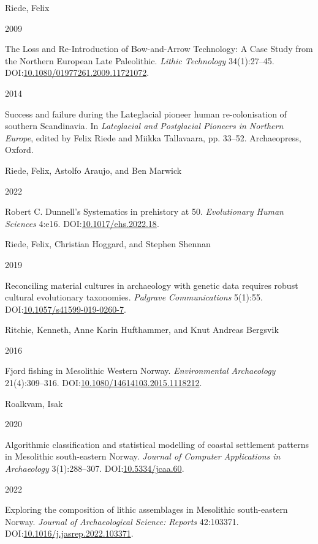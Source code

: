 \documentclass[
  12pt,
  a4paper,
  oneside]{book}
\newlength{\cslhangindent}
\newlength{\csllabelwidth}
\newlength{\cslentryspacingunit} %
\newenvironment{CSLReferences}[2] %
 {%
  \setlength{\parindent}{0pt}
  \ifodd #1
  \let\oldpar\par
  \def\par{\hangindent=\cslhangindent\oldpar}
  \fi
  \setlength{\parskip}{#2\cslentryspacingunit}
 }%
 {}
\newcommand{\CSLBlock}[1]{#1\hfill\break}
\newcommand{\CSLLeftMargin}[1]{\parbox[t]{\csllabelwidth}{#1}}
\newcommand{\CSLRightInline}[1]{\parbox[t]{\linewidth - \csllabelwidth}{#1}\break}
\begin{document}
\begin{CSLReferences}{0}{0}
\leavevmode{}%
\CSLBlock{Riede, Felix}
\CSLLeftMargin{ 2009}
\CSLRightInline{The Loss and Re-Introduction of Bow-and-Arrow Technology: A Case Study from the Northern European Late Paleolithic. \emph{Lithic Technology} 34(1):27--45. DOI:\href{https://doi.org/10.1080/01977261.2009.11721072}{10.1080/01977261.2009.11721072}.}

\leavevmode{}%
\CSLLeftMargin{ 2014 }
\CSLRightInline{{Success and failure during the Lateglacial pioneer human re-colonisation of southern Scandinavia}. In \emph{{Lateglacial and Postglacial Pioneers in Northern Europe}}, edited by Felix Riede and Miikka Tallavaara, pp. 33--52. Archaeopress, Oxford.}

\leavevmode{}%
\CSLBlock{Riede, Felix, Astolfo Araujo, and Ben Marwick}
\CSLLeftMargin{ 2022}
\CSLRightInline{{Robert C. Dunnell's Systematics in prehistory at 50}. \emph{Evolutionary Human Sciences} 4:e16. DOI:\href{https://doi.org/10.1017/ehs.2022.18}{10.1017/ehs.2022.18}.}

\leavevmode{}%
\CSLBlock{Riede, Felix, Christian Hoggard, and Stephen Shennan}
\CSLLeftMargin{ 2019}
\CSLRightInline{Reconciling material cultures in archaeology with genetic data requires robust cultural evolutionary taxonomies. \emph{Palgrave Communications} 5(1):55. DOI:\href{https://doi.org/10.1057/s41599-019-0260-7}{10.1057/s41599-019-0260-7}.}

\leavevmode{}%
\CSLBlock{Ritchie, Kenneth, Anne Karin Hufthammer, and Knut Andreas Bergsvik}
\CSLLeftMargin{ 2016}
\CSLRightInline{{Fjord fishing in Mesolithic Western Norway}. \emph{Environmental Archaeology} 21(4):309--316. DOI:\href{https://doi.org/10.1080/14614103.2015.1118212}{10.1080/14614103.2015.1118212}.}

\leavevmode{}%
\CSLBlock{Roalkvam, Isak}
\CSLLeftMargin{ 2020}
\CSLRightInline{{Algorithmic classification and statistical modelling of coastal settlement patterns in Mesolithic south-eastern Norway}. \emph{Journal of Computer Applications in Archaeology} 3(1):288--307. DOI:\href{https://doi.org/10.5334/jcaa.60}{10.5334/jcaa.60}.}

\leavevmode{}%
\CSLLeftMargin{ 2022 }
\CSLRightInline{{Exploring the composition of lithic assemblages in Mesolithic south-eastern Norway}. \emph{Journal of Archaeological Science: Reports} 42:103371. DOI:\href{https://doi.org/10.1016/j.jasrep.2022.103371}{10.1016/j.jasrep.2022.103371}.}


\end{CSLReferences}
\end{document}
